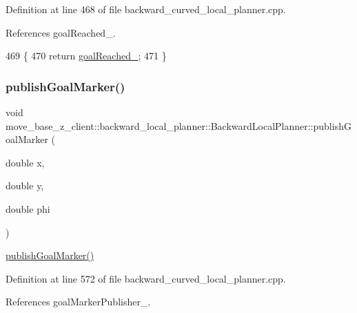Definition at line 468 of file backward\+\_\+curved\+\_\+local\+\_\+planner.\+cpp.



References goal\+Reached\+\_\+.


\begin{DoxyCode}
469 \{
470     \textcolor{keywordflow}{return} \hyperlink{classmove__base__z__client_1_1backward__local__planner_1_1BackwardLocalPlanner_a0a89141d3d3a8ebfb9e1d69d0d33fd49}{goalReached\_};
471 \}
\end{DoxyCode}
\mbox{\label{classmove__base__z__client_1_1backward__local__planner_1_1BackwardLocalPlanner_a691e565d33666d2f7004e791cae29b42}} 
\subsubsection{\texorpdfstring{publish\+Goal\+Marker()}{publishGoalMarker()}}
{\footnotesize\ttfamily void move\+\_\+base\+\_\+z\+\_\+client\+::backward\+\_\+local\+\_\+planner\+::\+Backward\+Local\+Planner\+::publish\+Goal\+Marker (\begin{DoxyParamCaption}\item[{double}]{x,  }\item[{double}]{y,  }\item[{double}]{phi }\end{DoxyParamCaption})\hspace{0.3cm}{\ttfamily [private]}}

\hyperlink{classmove__base__z__client_1_1backward__local__planner_1_1BackwardLocalPlanner_a691e565d33666d2f7004e791cae29b42}{publish\+Goal\+Marker()} 

Definition at line 572 of file backward\+\_\+curved\+\_\+local\+\_\+planner.\+cpp.



References goal\+Marker\+Publisher\+\_\+.



